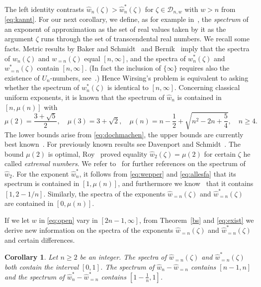\documentclass[12pt]{amsart}
\newtheorem{corollary}[theorem]{Corollary}
\theoremstyle{definition}
\begin{document}
The left identity 
contrasts $\widehat{w}_{n}(\zeta)>\widehat{w}_{n}^{\ast}(\zeta)$
for $\zeta\in\mathscr{D}_{n,w}$ with $w>n$ from \eqref{eq:kannt}.
For our next corollary,
we define, as for example in~\cite{bug}, 
the {\em spectrum} of an exponent of approximation as the set of real values taken by it as the argument
$\zeta$ runs through the set of transcendental real numbers.
We recall some facts.
Metric results by Baker and Schmidt~\cite{baks}
and Bernik~\cite{bernik} imply that the spectra of $w_{n}(\zeta)$ 
and $w_{=n}(\zeta)$ 
equal $[n,\infty]$, and the spectra 
of $w_{n}^{\ast}(\zeta)$ and $w_{=n}^{\ast}(\zeta)$ contain $[n,\infty]$.
(In fact the inclusion of $\{\infty\}$ requires also the existence of $U_{n}$-numbers, see~\cite{leveque}.) Hence
Wirsing's problem is equivalent to asking whether the spectrum of $w_{n}^{\ast}(\zeta)$ is identical to $[n,\infty]$.
Concerning classical uniform exponents,
it is known that the spectrum of $\widehat{w}_{n}$ is 
contained in $[n,\mu(n)]$ with
%
\begin{equation}  \label{eq:muehka}
\mu(2)=\frac{3+\sqrt{5}}{2},\quad \mu(3)= 3+\sqrt{2},\quad
\mu(n)= n-\frac{1}{2}+\sqrt{n^{2}-2n+\frac{5}{4}}, \quad n\geq 4.
\end{equation}
%
The lower bounds arise from \eqref{eq:dochmachen}, the
upper bounds are currently best known~\cite[Theorem~2.1]{bschlei}. 
For previously known results see Davenport and Schmidt~\cite{davsh}. 
The bound $\mu(2)$ is optimal, Roy~\cite{roy} proved equality 
$\widehat{w}_{2}(\zeta)=\mu(2)$ for certain
$\zeta$ he called {\em extremal numbers}. 
We refer to~\cite{bdraft} for further references on the 
spectrum of $\widehat{w}_{2}$. For the exponent $\widehat{w}_{n}^{\ast}$,
it follows from \eqref{eq:wepper} and \eqref{eq:allesfa} 
that its spectrum is contained in $[1,\mu(n)]$, and
furthermore we know~\cite{bdraft} that it contains $[1,2-1/n]$.
Similarly, the spectra of the exponents $\widehat{w}_{=n}(\zeta)$ 
and $\widehat{w}_{=n}^{\ast}(\zeta)$ 
are contained in $[0,\mu(n)]$.

If we let $w$ in \eqref{eq:open}
vary in $[2n-1,\infty]$, from Theorem~\ref{bs} and \eqref{eq:exist} we derive new information on the spectra of 
the exponents 
$\widehat{w}_{=n}(\zeta)$ and $\widehat{w}_{=n}^{\ast}(\zeta)$ 
and certain differences.

\begin{corollary} \label{sb}    %
Let $n\geq 2$ be an integer.
The spectra of $\widehat{w}_{=n}(\zeta)$ and $\widehat{w}_{=n}^{\ast}(\zeta)$
both contain the interval $[0,1]$. 
The spectrum of $\widehat{w}_{n}-\widehat{w}_{=n}$ contains $[n-1,n]$ and the spectrum 
of $\widehat{w}_{n}^{\ast}-\widehat{w}_{=n}^{\ast}$ contains $[1-\frac{1}{n},1]$.
\end{corollary}
\end{document}
